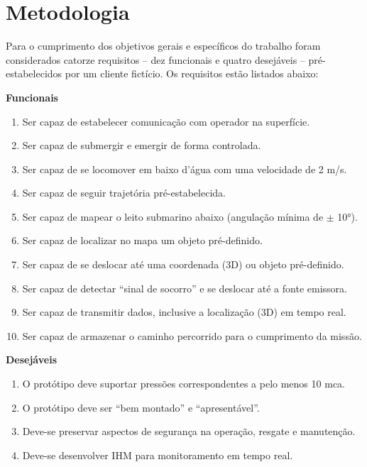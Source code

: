 \section{Metodologia}
\label{sec:metodologia}

Para o cumprimento dos objetivos gerais e específicos do trabalho foram considerados catorze requisitos -- dez funcionais e quatro desejáveis -- pré-estabelecidos por um cliente fictício. Os requisitos estão listados abaixo:
\vspace{1 mm}

\textbf{Funcionais}
\begin{enumerate}
	\item Ser capaz de estabelecer comunicação com operador na superfície.
	\item Ser capaz de submergir e emergir de forma controlada.
	\item Ser capaz de se locomover em baixo d'água com uma velocidade de 2 m/s.
	\item Ser capaz de seguir trajetória pré-estabelecida.
	\item Ser capaz de mapear o leito submarino abaixo (angulação mínima de $ \pm $ 10°).
	\item Ser capaz de localizar no mapa um objeto pré-definido.
	\item Ser capaz de se deslocar até uma coordenada (3D) ou objeto pré-definido.
	\item Ser capaz de detectar ``sinal de socorro'' e se deslocar até a fonte emissora.
	\item Ser capaz de transmitir dados, inclusive a localização (3D) em tempo real.
	\item Ser capaz de armazenar o caminho percorrido para o cumprimento da missão.
\end{enumerate}

\textbf{Desejáveis}

\begin{enumerate}[resume]
	\item O protótipo deve suportar pressões correspondentes a pelo menos 10 mca.
	\item O protótipo deve ser ``bem montado'' e ``apresentável''.
	\item Deve-se preservar aspectos de segurança na operação, resgate e manutenção.
	\item Deve-se desenvolver IHM para monitoramento em tempo real.	
\end{enumerate}

\vspace{1 mm}

